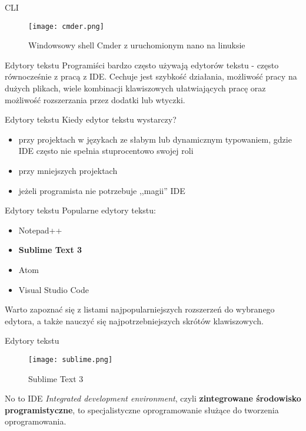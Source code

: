 \begin{frame}{CLI}
	\begin{figure}[t]
		\centering
		\texttt{[image: cmder.png]}
		\caption{Windowsowy shell Cmder z uruchomionym nano na linuksie}
	\end{figure}
\end{frame}

\begin{frame}{Edytory tekstu}
	Programiści bardzo często używają edytorów tekstu - często równocześnie z pracą z IDE. Cechuje jest szybkość działania, możliwość pracy na dużych plikach, wiele kombinacji klawiszowych ułatwiających pracę oraz możliwość rozszerzania przez dodatki lub wtyczki.
\end{frame}

\begin{frame}{Edytory tekstu}
	Kiedy edytor tekstu wystarczy?
	\begin{itemize}
		\item przy projektach w językach ze słabym lub dynamicznym typowaniem, gdzie IDE często nie spełnia stuprocentowo swojej roli
		\item przy mniejszych projektach
		\item jeżeli programista nie potrzebuje ,,magii'' IDE
	\end{itemize}
\end{frame}

\begin{frame}{Edytory tekstu}
	Popularne edytory tekstu:
	\begin{itemize}
		\item Notepad++
		\item \textbf{Sublime Text 3}
		\item Atom
		\item Visual Studio Code
	\end{itemize}
	
	Warto zapoznać się z listami najpopularniejszych rozszerzeń do wybranego edytora, a także nauczyć się najpotrzebniejszych skrótów klawiszowych.
\end{frame}

\begin{frame}{Edytory tekstu}
	\begin{figure}[t]
		\centering
		\texttt{[image: sublime.png]}
		\caption{Sublime Text 3}
	\end{figure}
\end{frame}

\begin{frame}{No to IDE}
	\emph{Integrated development environment}, czyli \textbf{zintegrowane środowisko programistyczne}, to specjalistyczne oprogramowanie służące do tworzenia oprogramowania.
\end{frame}

